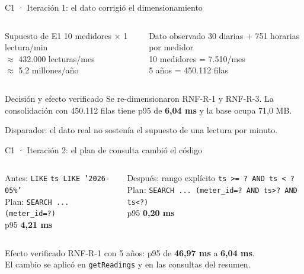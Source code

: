 \documentclass[aspectratio=169,10pt]{beamer}
\newcommand{\good}[1]{\textcolor{GoodGreen}{\textbf{#1}}}
\newcommand{\warn}[1]{\textcolor{WarnAmber}{\textbf{#1}}}
\newcommand{\code}[1]{\texttt{\small #1}}
\begin{document}
\begin{frame}{C1 · Iteración 1: el dato corrigió el dimensionamiento}
  \begin{columns}[T,onlytextwidth]
      \begin{block}{Supuesto de E1}
        10 medidores $\times$ 1 lectura/min\\
        $\approx$ 432.000 lecturas/mes\\
        $\approx$ 5,2 millones/año
      \end{block}
      \begin{block}{Dato observado}
        30 diarias + 751 horarias por medidor\\
        10 medidores = 7.510/mes\\
        5 años = 450.112 filas
      \end{block}
  \end{columns}
  \vspace{2mm}
  \begin{block}{Decisión y efecto verificado}
    Se re-dimensionaron RNF-R-1 y RNF-R-3. La consolidación con 450.112 filas tiene
    p95 de \good{6,04 ms} y la base ocupa 71,0 MB.
  \end{block}
  \vspace{1mm}
  {\scriptsize Disparador: el dato real no sostenía el supuesto de una lectura por minuto.}
\end{frame}

\begin{frame}{C1 · Iteración 2: el plan de consulta cambió el código}
  \begin{columns}[T,onlytextwidth]
      \begin{block}{Antes: \code{LIKE}}
        \code{ts LIKE '2026-05\%'}\\[1mm]
        Plan: \code{SEARCH ... (meter\_id=?)}\\[1mm]
        p95 \warn{4,21 ms}
      \end{block}
      \begin{block}{Después: rango explícito}
        \code{ts >= ? AND ts < ?}\\[1mm]
        Plan: \code{SEARCH ... (meter\_id=? AND ts>? AND ts<?)}\\[1mm]
        p95 \good{0,20 ms}
      \end{block}
  \end{columns}
  \vspace{2mm}
  \begin{block}{Efecto verificado}
    RNF-R-1 con 5 años: p95 de \warn{46,97 ms} a \good{6,04 ms}.\\
    El cambio se aplicó en \code{getReadings} y en las consultas del resumen.
  \end{block}
\end{frame}
\end{document}
